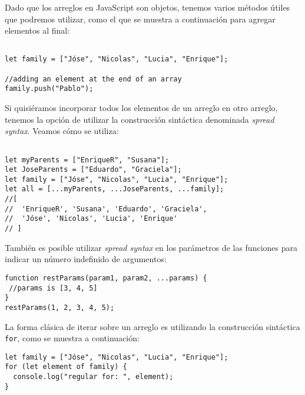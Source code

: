 \documentclass[a4paper, oneside, titlepage, 12pt]{paper}
\begin{document}
Dado que los arreglos en JavaScript son objetos, tenemos varios métodos útiles que podremos utilizar, como el que se muestra a continuación para agregar elementos al final:

\begin{verbatim}

let family = ["Jóse", "Nicolas", "Lucia", "Enrique"];

//adding an element at the end of an array
family.push("Pablo");
\end{verbatim}

Si quisiéramos incorporar todos los elementos de un arreglo en otro arreglo, tenemos la opción de utilizar la construcción sintáctica denominada \textit{spread syntax}. Veamos cómo se utiliza:

\begin{verbatim}

let myParents = ["EnriqueR", "Susana"];
let JoseParents = ["Eduardo", "Graciela"];
let family = ["Jóse", "Nicolas", "Lucia", "Enrique"];
let all = [...myParents, ...JoseParents, ...family];
//[
//  'EnriqueR', 'Susana', 'Eduardo', 'Graciela', 
//  'Jóse', 'Nicolas', 'Lucia', 'Enrique'
// ]
\end{verbatim}

También es posible utilizar \textit{spread syntax} en los parámetros de las funciones para indicar un número indefinido de argumentos:

\begin{verbatim}
function restParams(param1, param2, ...params) {
 //params is [3, 4, 5]	
}
restParams(1, 2, 3, 4, 5);
\end{verbatim}

La forma clásica de iterar sobre un arreglo es utilizando la construcción sintáctica \texttt{for}, como se muestra a continuación: 

\begin{verbatim}
let family = ["Jóse", "Nicolas", "Lucia", "Enrique"];
for (let element of family) {
  console.log("regular for: ", element);
}
\end{verbatim}
               
\end{document}
